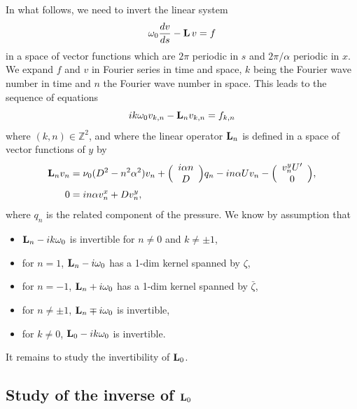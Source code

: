 \documentclass[11pt]{article}
\begin{document}
In what follows, we need to invert the linear system
$$
\omega_0 {dv \over ds} - {\bf L} \, v = f
$$
in a space of vector functions which are $2 \pi$ periodic in $s$ and 
$2 \pi / \alpha$ periodic in $x$.
We expand $f$ and $v$ in Fourier series in time and space, $k$ being the Fourier wave number in time and $n$ the Fourier wave number in space. This leads to the sequence of equations
$$
i k \omega_0 v_{k,n} - {\bf L}_n v_{k,n} = f_{k,n}
$$
where $(k,n) \in \mathbb{Z}^2$, and where the linear operator ${\bf L}_n$ is defined
in a space of vector functions of $y$ by
\begin{align*}
{\bf L}_n v_n &= \nu_0 (D^2 - n^2 \alpha^2) v_n 
+ \Bigl( \begin{array}{c} i \alpha n \cr D \cr \end{array} \Bigr) q_n
- i n \alpha U v_n 
- \Bigl( \begin{array}{c} v_n^y U' \cr 0 \cr \end{array} \Bigr),
\\
0 &= i n \alpha v_n^x + D v_n^y,
\end{align*}
where $q_n$ is the related component of the pressure.
We know by assumption that 
\begin{itemize}
\item ${\bf L}_n - i k \omega_0$ is invertible for  $n \ne 0$ and  $k \ne \pm 1$,

\item for  $n = 1$, ${\bf L}_n - i \omega_0$ has a 1-dim kernel spanned
by $\zeta$, 

\item for $n = -1$, ${\bf L}_n + i \omega_0$ has a 1-dim kernel spanned by 
$\bar \zeta$,

\item for  $n \ne \pm 1$, ${\bf L}_n \mp i \omega_0$ is invertible,

\item for $k \ne 0$, ${\bf L}_0 - i k \omega_0$ is invertible.
\end{itemize}
It remains to study the invertibility of ${\bf L}_0$. 




\subsection{Study of the inverse of ${\bf L}_0$}

\end{document}
